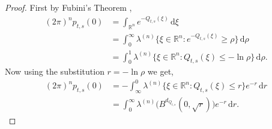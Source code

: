\documentclass[a4paper, 12pt]{report}
\theoremstyle{remark}
\theoremstyle{definition}
\begin{document}
\begin{proof}
First by Fubini's Theorem \cite[Theorem 13.11]{FubiniBook},
\begin{align}
(2\pi)^np_{t, s}(0) & = \int_{\mathbb{R}^n}e^{-Q_{t, s}(\xi)}\,\mathrm{d}\xi\nonumber\\
& = \int_0^\infty\lambda^{(n)}\big\{\xi \in \mathbb{R}^n : e^{-Q_{t, s}(\xi)} \ge\rho\big\}\,\mathrm{d}\rho\nonumber\\
& = \int_0^1\lambda^{(n)}\big\{\xi \in \mathbb{R}^n : Q_{t, s}(\xi) \le -\ln\rho\big\}\,\mathrm{d}\rho\nonumber.
\end{align}
Now using the substitution $r = -\ln\rho$ we get,
\begin{align}
(2\pi)^np_{t, s}(0) & = -\int_\infty^0\lambda^{(n)}\big\{\xi \in \mathbb{R}^n : Q_{t, s}(\xi) \le r\big\}e^{-r}\,\mathrm{d}r\nonumber\\
& = \int_0^\infty\lambda^{(n)}\big(B^{d_{Q_{t, s}}}(0, \sqrt{r})\big)e^{-r}\,\mathrm{d}r.\nonumber
\end{align}


\end{proof}
\end{document}
